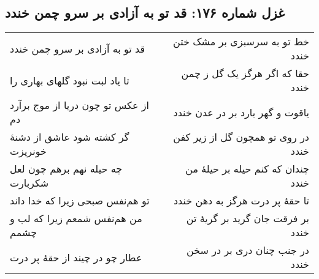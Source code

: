 \begin{center}
\section*{غزل شماره ۱۷۶: قد تو به آزادی بر سرو چمن خندد}
\label{sec:176}
\begin{longtable}{l p{0.5cm} r}
قد تو به آزادی بر سرو چمن خندد
&&
خط تو به سرسبزی بر مشک ختن خندد
\\
تا یاد لبت نبود گلهای بهاری را
&&
حقا که اگر هرگز یک گل ز چمن خندد
\\
از عکس تو چون دریا از موج برآرد دم
&&
یاقوت و گهر بارد بر در عدن خندد
\\
گر کشته شود عاشق از دشنهٔ خونریزت
&&
در روی تو همچون گل از زیر کفن خندد
\\
چه حیله نهم برهم چون لعل شکربارت
&&
چندان که کنم حیله بر حیلهٔ من خندد
\\
تو هم‌نفس صبحی زیرا که خدا داند
&&
تا حقهٔ پر درت هرگز به دهن خندد
\\
من هم‌نفس شمعم زیرا که لب و چشمم
&&
بر فرقت جان گرید بر گریهٔ تن خندد
\\
عطار چو در چیند از حقهٔ پر درت
&&
در جنب چنان دری بر در سخن خندد
\\
\end{longtable}
\end{center}
